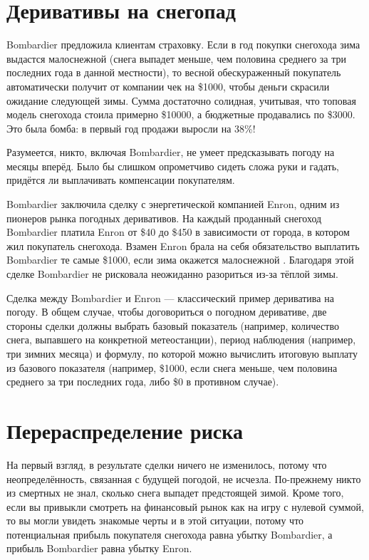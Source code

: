 \section*{Деривативы на снегопад}

Bombardier предложила клиентам страховку. Если в год покупки снегохода зима выдастся
малоснежной (снега выпадет меньше, чем половина среднего за три последних года в
данной местности), то весной обескураженный покупатель автоматически получит от компании чек
на \$\num{1000}, чтобы деньги скрасили ожидание следующей зимы. Сумма
достаточно солидная, учитывая, что топовая модель снегохода стоила примерно
\$\num{10000}, а бюджетные продавались по \$\num{3000}. Это была бомба: в
первый год продажи выросли на 38\%!

Разумеется, никто, включая Bombardier, не умеет предсказывать погоду на месяцы
вперёд. Было бы слишком опрометчиво сидеть сложа руки и гадать, придётся ли
выплачивать компенсации покупателям.

Bombardier заключила сделку с энергетической компанией Enron, одним из пионеров рынка погодных деривативов. На каждый проданный
снегоход Bombardier платила Enron от \$40 до \$450 в зависимости от города, в котором
жил покупатель снегохода. Взамен Enron брала на себя обязательство выплатить Bombardier те
самые \$\num{1000}, если зима окажется малоснежной \cite{wsj1999}. Благодаря этой сделке
Bombardier не рисковала неожиданно разориться из-за тёплой зимы. 

Сделка между Bombardier и Enron --- классический пример дериватива на погоду. В общем случае,
чтобы договориться о погодном деривативе, две стороны сделки должны выбрать
базовый показатель (например, количество снега, выпавшего на
конкретной метеостанции), период наблюдения (например, три зимних месяца) и
формулу, по которой можно вычислить итоговую выплату из базового
показателя (например, \$\num{1000}, если снега меньше, чем половина среднего за три последних года, либо \$0 в противном случае).

\section*{Перераспределение риска}

На первый взгляд, в результате сделки ничего не изменилось, потому что
неопределённость, связанная с будущей погодой, не исчезла. По-прежнему никто из
смертных не знал, сколько снега выпадет предстоящей зимой. Кроме того, если вы
привыкли смотреть на финансовый рынок как на игру с нулевой суммой, то вы могли
увидеть знакомые черты и в этой ситуации, потому что потенциальная прибыль
покупателя снегохода равна убытку Bombardier, а прибыль Bombardier равна убытку
Enron.

